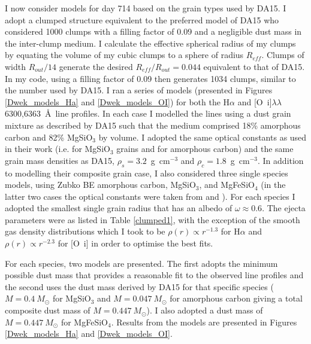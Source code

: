 I now consider models for day 714 based on the grain types
used by DA15.  I adopt a clumped structure equivalent to the 
preferred model of DA15 who considered 1000 clumps with a filling factor of 
0.09 and a negligible dust mass in the inter-clump medium.  I calculate 
the effective spherical radius of my clumps by equating the volume of my 
cubic clumps to a sphere of radius $R_{eff}$.  Clumps of width 
$R_{out}/14$ generate the desired $R_{eff}/R_{out}=0.044$ equivalent to 
that of DA15.  In my code, using a filling factor of 0.09 then generates 
1034 clumps, similar to the number used by DA15.  I ran a series of models 
(presented in Figures \ref{Dwek_models_Ha} and \ref{Dwek_models_OI}) for 
both the H$\alpha$ and [O~{\sc i}]$\lambda\lambda$6300,6363~\AA\ line profiles.  
In each case I modelled the lines using a dust grain mixture as described 
by DA15 such that the medium comprised 18\% amorphous carbon and 82\% 
MgSiO$_3$ by volume.  I adopted the same optical constants as used in 
their work (i.e. \citet{Jager2003} for MgSiO$_3$ grains and 
\citet{Zubko1996} for amorphous carbon) and the same grain mass densities as DA15, 
$\rho_s=3.2$~g~cm$^{-3}$ and $\rho_c=1.8$~g~cm$^{-3}$.  In addition to 
modelling their composite grain case, I also considered three single 
species models, using Zubko BE amorphous carbon, MgSiO$_3$, and 
MgFeSiO$_4$ (in the latter two cases the optical constants were taken from 
\citet{Jager1994} and \citet{Dorschner1995}). For each species I 
adopted the smallest single grain radius that has an albedo of $\omega 
\approx 0.6$. The ejecta 
parameters were as listed in Table \ref{clumped1}, with the exception of 
the smooth gas density distributions which I took to be $\rho(r) \propto r^{-1.3}$ 
for H$\alpha$ and $\rho(r) \propto r^{-2.3}$ for [O~{\sc i}] in order to 
optimise the best fits.

For each species, two models are presented.  The first adopts the minimum 
possible dust mass that provides a reasonable fit to the observed line 
profiles and the second uses the dust mass derived by DA15 for that 
specific species ($M=0.4~M_{\odot}$ for MgSiO$_3$ and $M=0.047~M_{\odot}$ 
for amorphous carbon giving a total composite dust mass of 
$M=0.447~M_{\odot}$).  I also adopted a dust mass of $M=0.447~M_{\odot}$ for MgFeSiO$_4$.  Results 
from the models are presented in Figures \ref{Dwek_models_Ha} and 
\ref{Dwek_models_OI}.





